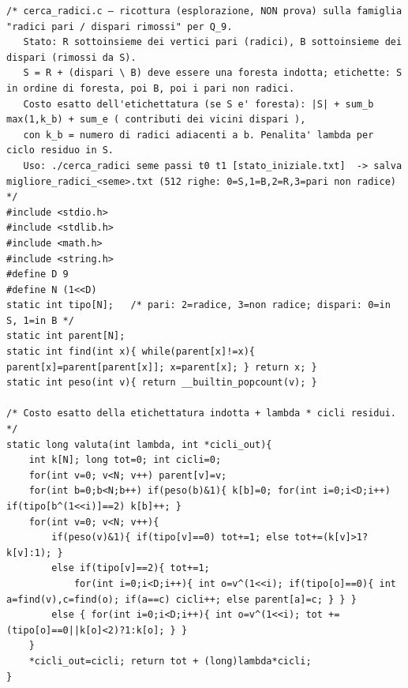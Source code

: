 \documentclass[11pt,a4paper]{article}
\begin{document}
\begin{lstlisting}[caption={attempt\_001 code\_4 [c, rigore exact] — Simulated annealing (exploration only) over pairs (R = even vertices kept in S, B' = odd v — verdetto del Referee: REJECT}]
/* cerca_radici.c — ricottura (esplorazione, NON prova) sulla famiglia "radici pari / dispari rimossi" per Q_9.
   Stato: R sottoinsieme dei vertici pari (radici), B sottoinsieme dei dispari (rimossi da S).
   S = R + (dispari \ B) deve essere una foresta indotta; etichette: S in ordine di foresta, poi B, poi i pari non radici.
   Costo esatto dell'etichettatura (se S e' foresta): |S| + sum_b max(1,k_b) + sum_e ( contributi dei vicini dispari ),
   con k_b = numero di radici adiacenti a b. Penalita' lambda per ciclo residuo in S.
   Uso: ./cerca_radici seme passi t0 t1 [stato_iniziale.txt]  -> salva migliore_radici_<seme>.txt (512 righe: 0=S,1=B,2=R,3=pari non radice) */
#include <stdio.h>
#include <stdlib.h>
#include <math.h>
#include <string.h>
#define D 9
#define N (1<<D)
static int tipo[N];   /* pari: 2=radice, 3=non radice; dispari: 0=in S, 1=in B */
static int parent[N];
static int find(int x){ while(parent[x]!=x){ parent[x]=parent[parent[x]]; x=parent[x]; } return x; }
static int peso(int v){ return __builtin_popcount(v); }

/* Costo esatto della etichettatura indotta + lambda * cicli residui. */
static long valuta(int lambda, int *cicli_out){
    int k[N]; long tot=0; int cicli=0;
    for(int v=0; v<N; v++) parent[v]=v;
    for(int b=0;b<N;b++) if(peso(b)&1){ k[b]=0; for(int i=0;i<D;i++) if(tipo[b^(1<<i)]==2) k[b]++; }
    for(int v=0; v<N; v++){
        if(peso(v)&1){ if(tipo[v]==0) tot+=1; else tot+=(k[v]>1?k[v]:1); }
        else if(tipo[v]==2){ tot+=1;
            for(int i=0;i<D;i++){ int o=v^(1<<i); if(tipo[o]==0){ int a=find(v),c=find(o); if(a==c) cicli++; else parent[a]=c; } } }
        else { for(int i=0;i<D;i++){ int o=v^(1<<i); tot += (tipo[o]==0||k[o]<2)?1:k[o]; } }
    }
    *cicli_out=cicli; return tot + (long)lambda*cicli;
}


\end{lstlisting}
\end{document}
